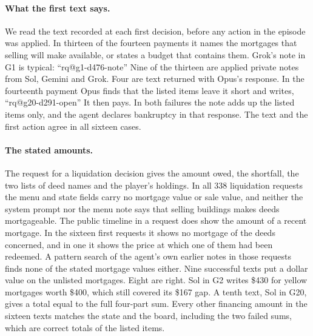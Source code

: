 \documentclass[11pt,letterpaper]{article}
\makeatletter
\newcommand{\QuoteInline}[1]{``\csname rq@#1\endcsname''}
\makeatother
\begin{document}
\paragraph{What the first text says.} We read the text recorded at each first decision, before any action in the episode was applied. In thirteen of the fourteen payments it names the mortgages that selling will make available, or states a budget that contains them. Grok's note in G1 is typical: \QuoteInline{g1-d476-note} Nine of the thirteen are applied private notes from Sol, Gemini and Grok. Four are text returned with Opus's response. In the fourteenth payment Opus finds that the listed items leave it short and writes, \QuoteInline{g20-d291-open} It then pays. In both failures the note adds up the listed items only, and the agent declares bankruptcy in that response. The text and the first action agree in all sixteen cases.

\paragraph{The stated amounts.} The request for a liquidation decision gives the amount owed, the shortfall, the two lists of deed names and the player's holdings. In all 338 liquidation requests the menu and state fields carry no mortgage value or sale value, and neither the system prompt nor the menu note says that selling buildings makes deeds mortgageable. The public timeline in a request does show the amount of a recent mortgage. In the sixteen first requests it shows no mortgage of the deeds concerned, and in one it shows the price at which one of them had been redeemed. A pattern search of the agent's own earlier notes in those requests finds none of the stated mortgage values either. Nine successful texts put a dollar value on the unlisted mortgages. Eight are right. Sol in G2 writes \$430 for yellow mortgages worth \$400, which still covered its \$167 gap. A tenth text, Sol in G20, gives a total equal to the full four-part sum. Every other financing amount in the sixteen texts matches the state and the board, including the two failed sums, which are correct totals of the listed items.
\end{document}
